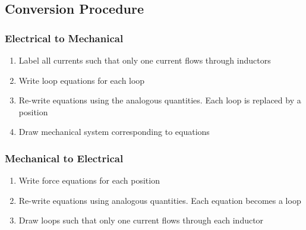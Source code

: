 \subsection*{Conversion Procedure}
\subsubsection*{Electrical to Mechanical}
\begin{enumerate}
  \item Label all currents such that only one current flows through inductors
  \item Write loop equations for each loop
  \item Re-write equations using the analogous quantities. Each loop is replaced by a position
  \item Draw mechanical system corresponding to equations
\end{enumerate} 
\subsubsection*{Mechanical to Electrical}
\begin{enumerate}
  \item Write force equations for each position
  \item Re-write equations using analogous quantities. Each equation becomes a loop
  \item Draw loops such that only one current flows through each inductor
\end{enumerate}


